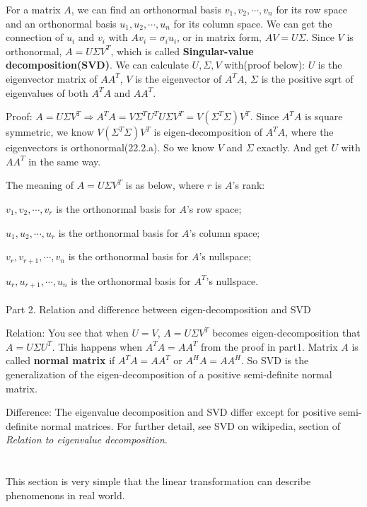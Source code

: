 \documentclass{article}
\begin{document}
\begin{spacing}{1.5}
For a matrix $A$, we can find an orthonormal basis $v_1, v_2, \cdots, v_n$ for its row space and an orthonormal basis $u_1, u_2, \cdots, u_n$ for its column space. We can get the connection of $u_i$ and $v_i$ with $Av_i=\sigma_i u_i$, or in matrix form, $AV=U\Sigma$. Since $V$ is orthonormal, $A=U \Sigma V^T$, which is called {\bfseries Singular-value decomposition(SVD)}. We can calculate $U, \Sigma, V$ with(proof below): $U$ is the eigenvector matrix of $AA^T$, $V$ is the eigenvector of $A^TA$, $\Sigma$ is the positive sqrt of eigenvalues of both $A^TA$ and $AA^T$. 

Proof: $A=U \Sigma V^T \Rightarrow A^TA=V\Sigma^T U^TU \Sigma V^T=V(\Sigma^T \Sigma) V^T$. Since $A^TA$ is square symmetric, we know $V(\Sigma^T \Sigma) V^T$ is eigen-decomposition of $A^TA$, where the eigenvectors is orthonormal(22.2.a). So we know $V$ and $\Sigma$ exactly. And get $U$ with $AA^T$ in the same way.

The meaning of $A=U \Sigma V^T$ is as below, where $r$ is $A$'s rank: 

$v_1, v_2, \cdots, v_r$ is the orthonormal basis for $A$'s row space;

$u_1, u_2, \cdots, u_r$ is the orthonormal basis for $A$'s column space; 

$v_r, v_{r+1}, \cdots, v_n$ is the orthonormal basis for $A$'s nullspace; 

$u_r, u_{r+1}, \cdots, u_n$ is the orthonormal basis for $A^T$'s nullspace.
\\\\ Part 2. Relation and difference between eigen-decomposition and SVD

Relation: You see that when $U=V$, $A=U \Sigma V^T$ becomes eigen-decomposition that $A=U \Sigma U^T$. This happens when $A^TA=AA^T$ from the proof in part1. Matrix $A$ is called {\bfseries normal matrix} if $A^TA=AA^T$ or $A^HA=AA^H$. So SVD is the generalization of the eigen-decomposition of a positive semi-definite normal matrix. 

Difference: The eigenvalue decomposition and SVD differ except for positive semi-definite normal matrices. For further detail, see SVD on wikipedia, section of \textit{Relation to eigenvalue decomposition}.

\section{}
\hspace*{0.5cm} This section is very simple that the linear transformation can describe phenomenons in real world.


\end{spacing}
\end{document}
